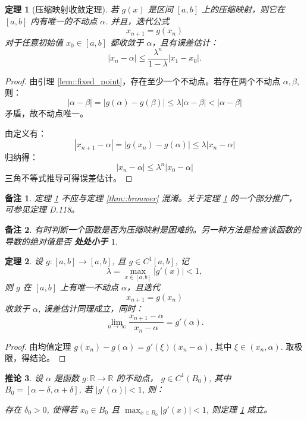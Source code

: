 \documentclass[a4paper]{ctexart}
\newtheorem{theorem}{定理}
\newtheorem{remark}{备注}
\newtheorem{corollary}[theorem]{推论}
\numberwithin{theorem}{section}
\numberwithin{equation}{section}
\numberwithin{figure}{section}
\numberwithin{remark}{section}
\begin{document}
\begin{theorem}[压缩映射收敛定理]
    \label{thm::contraction}
若 \( g(x) \) 是区间 \([a, b]\) 上的压缩映射，则它在 \([a, b]\) 内有唯一的不动点 \( \alpha \). 并且，迭代公式
\[
x_{n+1} = g(x_n)
\]
对于任意初始值 \( x_0 \in [a, b] \) 都收敛于 \( \alpha \)，且有误差估计：
\begin{equation}
|x_n - \alpha| \leq \frac{\lambda^n}{1 - \lambda} |x_1 - x_0|.
\end{equation}
\end{theorem}

\begin{proof}
由引理 \ref{lem::fixed_point}，存在至少一个不动点。若存在两个不动点 \( \alpha, \beta \), 则：
\[
|\alpha - \beta| = |g(\alpha) - g(\beta)| \leq \lambda |\alpha - \beta| < |\alpha - \beta|
\]
矛盾，故不动点唯一。

由定义有：
\[
|x_{n+1} - \alpha| = |g(x_n) - g(\alpha)| \leq \lambda |x_n - \alpha|
\]
归纳得：
\[
|x_n - \alpha| \leq \lambda^n |x_0 - \alpha|
\]
三角不等式推导可得误差估计。
\end{proof}

\begin{remark}
定理 \ref{thm::contraction} 不应与定理 \ref{thm::brouwer} 混淆。关于定理 \ref{thm::contraction} 的一个部分推广，可参见定理 D.118。
\end{remark}

\begin{remark}
有时判断一个函数是否为压缩映射是困难的。另一种方法是检查该函数的导数的绝对值是否 \textbf{处处小于 $1$}.
\end{remark}

\begin{theorem}
    \label{thm::fixed_point_convergence}
设 \( g : [a, b] \to [a, b] \), 且 \( g \in C^1[a, b] \), 记
\[
\lambda = \max_{x \in [a, b]} |g'(x)| < 1,
\]
则 \( g \) 在 \([a, b]\) 上有唯一不动点 \(\alpha\)，且迭代
\[
x_{n+1} = g(x_n)
\]
收敛于 \(\alpha\), 误差估计同理成立，同时：
\begin{equation}
\lim_{n \to \infty} \frac{x_{n+1} - \alpha}{x_n - \alpha} = g'(\alpha).
\end{equation}
\end{theorem}

\begin{proof}
由均值定理 \( g(x_n) - g(\alpha) = g'(\xi)(x_n - \alpha) \), 其中 \( \xi \in (x_n, \alpha) \). 取极限，得结论。
\end{proof}

\begin{corollary}
    \label{cor::fixed_point_derivative}
设 \( \alpha \) 是函数 \( g : \mathbb{R} \to \mathbb{R} \) 的不动点，
\( g \in C^1(B_0) \), 其中 \( B_0 = [\alpha - \delta, \alpha + \delta] \), 若 \( |g'(\alpha)| < 1 \), 则：

存在 \( \delta_0 > 0 \), 使得若 \( x_0 \in B_0 \) 且 \( \max_{x \in B_0} |g'(x)| < 1 \), 则定理 \ref{thm::contraction} 成立。
\end{corollary}
\end{document}
